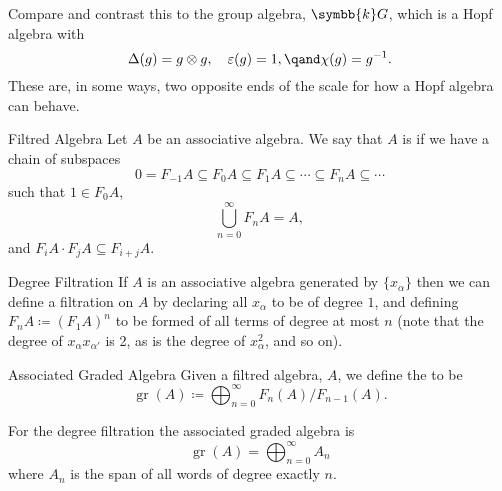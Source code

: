 \documentclass[fleqn]{NotesClass}
\renewcommand{\field}{\symbb{k}}
\DeclareMathOperator{\gr}{gr}
\begin{document}
    Compare and contrast this to the group algebra, \(\field G\), which is a Hopf algebra with
    \begin{equation}
        \Delta(g) = g \otimes g, \quad \varepsilon(g) = 1, \qand \chi(g) = g^{-1}.
    \end{equation}
    These are, in some ways, two opposite ends of the scale for how a Hopf algebra can behave.
    
    \begin{dfn}{Filtred Algebra}{}
        Let \(A\) be an associative algebra.
        We say that \(A\) is  if we have a chain of subspaces
        \begin{equation}
            0 = F_{-1}A \subseteq F_0A \subseteq F_1A \subseteq \dotsb \subseteq F_nA \subseteq \dotsb
        \end{equation}
        such that \(1 \in F_0 A\),
        \begin{equation}
            \bigcup_{n=0}^{\infty} F_nA = A,
        \end{equation}
        and \(F_iA \cdot F_jA \subseteq F_{i+j} A\).
    \end{dfn}
    
    \begin{dfn}{Degree Filtration}{}
        If \(A\) is an associative algebra generated by \(\{x_\alpha\}\) then we can define a filtration on \(A\) by declaring all \(x_\alpha\) to be of degree \(1\), and defining \(F_nA \coloneq (F_1A)^n\) to be formed of all terms of degree at most \(n\) (note that the degree of \(x_\alpha x_{\alpha'}\) is 2, as is the degree of \(x_\alpha^2\), and so on).
    \end{dfn}
    
    \begin{dfn}{Associated Graded Algebra}{}
        Given a filtred algebra, \(A\), we define the  to be
        \begin{equation}
            \gr(A) \coloneq \bigoplus_{n=0}^{\infty} F_n(A)/F_{n-1}(A).
        \end{equation}
    \end{dfn}
    
    For the degree filtration the associated graded algebra is
    \begin{equation}
        \gr(A) = \bigoplus_{n=0}^{\infty} A_n
    \end{equation}
    where \(A_n\) is the span of all words of degree exactly \(n\).
    
\end{document}
